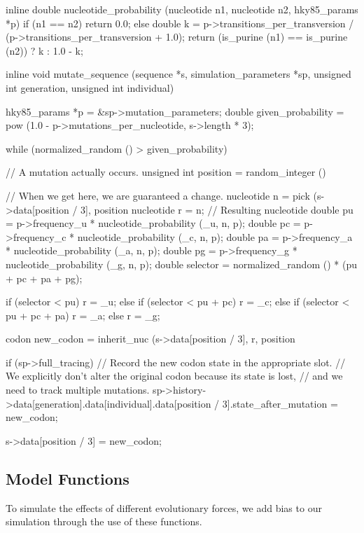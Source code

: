 \documentclass{article}
\begin{document}
\begin{ccode}
inline double nucleotide_probability (nucleotide n1, nucleotide n2, hky85_params *p) {
  if (n1 == n2)
    return 0.0;
  else {
    double k = p->transitions_per_transversion /
	       (p->transitions_per_transversion + 1.0);
    return (is_purine (n1) == is_purine (n2)) ? k : 1.0 - k;
  }
}

inline void mutate_sequence (sequence *s, simulation_parameters *sp,
			     unsigned int generation, unsigned int individual) {
  hky85_params *p = &sp->mutation_parameters;
  double given_probability = pow (1.0 - p->mutations_per_nucleotide, s->length * 3);

  while (normalized_random () > given_probability) {
    // A mutation actually occurs.
    unsigned int position = random_integer () %

    // When we get here, we are guaranteed a change.
    nucleotide n     = pick (s->data[position / 3], position %
    nucleotide r     = n; // Resulting nucleotide
    double pu        = p->frequency_u * nucleotide_probability (_u, n, p);
    double pc        = p->frequency_c * nucleotide_probability (_c, n, p);
    double pa        = p->frequency_a * nucleotide_probability (_a, n, p);
    double pg        = p->frequency_g * nucleotide_probability (_g, n, p);
    double selector  = normalized_random () * (pu + pc + pa + pg);

    if (selector < pu)        	 	r = _u;
    else if (selector < pu + pc)	r = _c;
    else if (selector < pu + pc + pa)	r = _a;
    else				r = _g;

    codon new_codon = inherit_nuc (s->data[position / 3], r, position %

    if (sp->full_tracing)
      // Record the new codon state in the appropriate slot.
      // We explicitly don't alter the original codon because its state is lost,
      // and we need to track multiple mutations.
      sp->history->data[generation].data[individual].data[position / 3].state_after_mutation = new_codon;

    s->data[position / 3] = new_codon;
  }
}
\end{ccode}

    \subsection{Model Functions}

      To simulate the effects of different evolutionary forces, we add bias to
      our simulation through the use of these functions.
\end{document}
